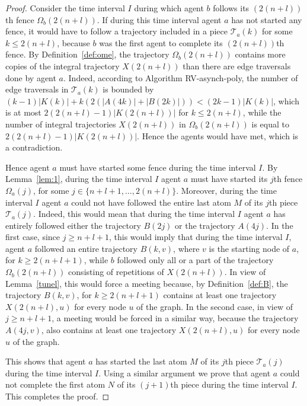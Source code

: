\documentclass [11pt] {article}
\begin{document}
\begin{proof}
Consider the time interval $I$ during which agent $b$ follows its $(2(n+l))$th fence $\Omega_b(2(n+l))$. If during this time interval agent $a$ has not started any fence,
it would have to follow a trajectory included in a piece $\mathcal{T}_a(k)$ for some $k\le 2(n+l)$, because $b$ was the first agent to complete its $(2(n+l))$th fence.
By Definition~\ref{def:ome}, the trajectory $\Omega_b(2(n+l))$ contains more copies of the integral trajectory {$X(2(n+l))$} than there are edge traversals done by agent $a$. 
Indeed, according to Algorithm RV-asynch-poly, the number of {edge traversals} in $\mathcal{T}_a(k)$ is bounded by {$(k-1)|K(k)| + k(2(|A(4k)|+|B(2k)|)) < (2k-1)|K(k)|$}, which is at most $2(2(n+l)-1)|K(2(n+l))|$ for $k\le 2(n+l)$, while the number of integral trajectories $X(2(n+l))$ in $\Omega_b(2(n+l))$ is equal to $2(2(n+l)-1)|K(2(n+l))|$.
Hence the agents would have met, which is a contradiction.

Hence agent $a$ must have started some fence during the time interval $I$. By Lemma~\ref{lem:1}, during the time interval $I$ agent $a$ must have started its
$j$th fence  $\Omega_a(j)$, for some $j\in\{n+l+1,\ldots,2(n+l)\}$. Moreover, during the time interval $I$ agent $a$ could not have followed the entire last atom {$M$} 
of its $j$th piece $\mathcal{T}_a(j)$. Indeed, this would mean that during the time interval $I$ agent $a$ has 
entirely followed either the trajectory $B(2j)$ or the trajectory $A(4j)$.
In the first case, since $j\ge n+l+1$,
this would imply that during the time interval $I$, agent $a$ followed an entire trajectory $B(k,v)$,
where $v$ is the starting node of $a$, for
$k\ge 2(n+l+1)$, while $b$ followed only all or a part of the trajectory $\Omega_b(2(n+l))$  consisting of repetitions of $X(2(n + l))$.
{In view of Lemma~\ref{tunel},} this would force a meeting because, by Definition~\ref{def:B},
the trajectory $B(k,v)$, for $k\ge 2(n+l+1)$ contains at least one trajectory $X(2(n+l),u)$ for every node $u$ of the graph. In the second case, in view of $j\ge n+l+1$, a meeting would be forced in a similar way, because the trajectory $A(4j,v)$, also contains at least one trajectory $X(2(n+l),u)$ for every node $u$ of the graph.

This shows that  agent $a$ has started the last atom {$M$} of its $j$th piece $\mathcal{T}_a(j)$ during the time interval $I$. Using a similar argument we prove that agent $a$ could not 
complete the first atom {$N$} of  its $(j+1)$th piece during the time interval $I$. This completes the proof. 
\end{proof}
\end{document}
